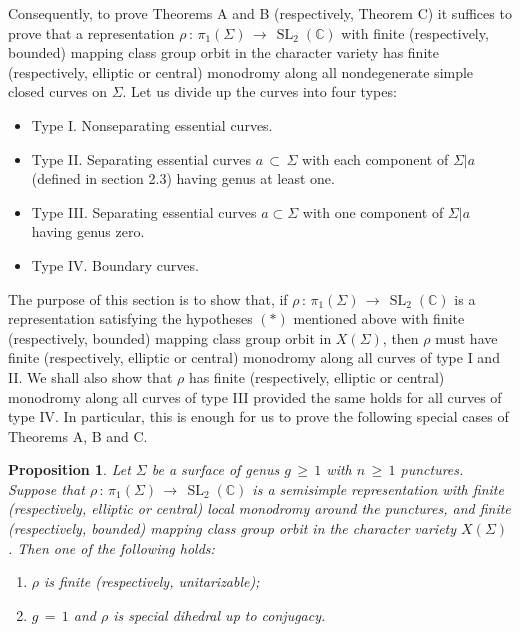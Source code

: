 \documentclass[reqno]{amsart}
\theoremstyle{plain}
\newtheorem{proposition}[theorem]{Proposition}
\theoremstyle{definition}
\theoremstyle{remark}
\newcommand{\C}{{\mathbb{C}}}
\DeclareMathOperator{\SL}{SL}
\begin{document}
Consequently, to prove Theorems A and B (respectively, Theorem C) it suffices to prove that a representation
$\rho\,:\,\pi_1(\Sigma)\,\to\,\SL_2(\C)$ with finite (respectively, bounded) mapping class group orbit in the
character variety has finite (respectively, elliptic or central) monodromy along all nondegenerate simple
closed curves on $\Sigma$. Let us divide up the curves into four types:
\begin{itemize}
\item {Type I.} Nonseparating essential curves.

\item {Type II.} Separating essential curves $a\,\subset\,\Sigma$ with each component of
$\Sigma|a$ (defined in section 2.3) having genus at least one.

\item {Type III.} Separating essential curves $a\subset\Sigma$ with one component of $\Sigma|a$ having genus zero.

\item {Type IV.} Boundary curves.
\end{itemize}
The purpose of this section is to show that, if $\rho\,:\,\pi_1(\Sigma)\,\to\,\SL_2(\C)$ is a representation satisfying 
the hypotheses $(*)$ mentioned above with finite (respectively, bounded) mapping class group orbit in 
$X(\Sigma)$, then $\rho$ must have finite (respectively, elliptic or central) monodromy along all curves of 
type I and II. We shall also show that $\rho$ has finite (respectively, elliptic or central) monodromy along 
all curves of type III provided the same holds for all curves of type IV. In particular, this is enough for us 
to prove the following special cases of Theorems A, B and C.

\begin{proposition}
\label{simple-finite}
Let $\Sigma$ be a surface of genus $g\,\geq\,1$ with $n\,\geq\,1$ punctures.
Suppose that $\rho\,:\,\pi_1(\Sigma)\,\to\,\SL_2(\C)$ is a semisimple representation with finite (respectively,
elliptic or central) local monodromy around the punctures, and finite (respectively, bounded) mapping
class group orbit in the character variety $X(\Sigma)$. Then one of the following holds:
\begin{enumerate}
\item $\rho$ is finite (respectively, unitarizable);

\item $g\,=\,1$ and $\rho$ is special dihedral up to conjugacy.
\end{enumerate}
\end{proposition}
\end{document}
